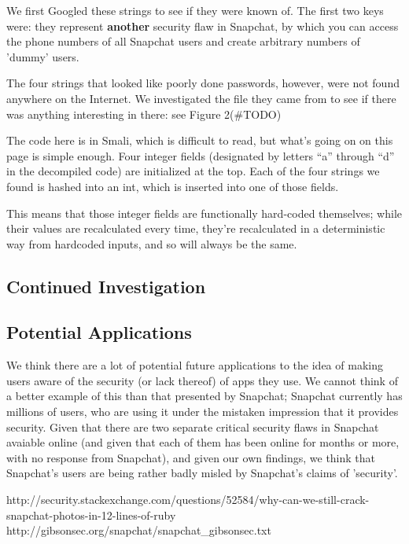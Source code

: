 \documentclass[11pt]{article}
\numberwithin{theorem}{subsection}
\begin{document}
We first Googled these strings to see if they were known of.  The first two keys were: they represent \textbf{another} security
flaw in Snapchat, by which you can access the phone numbers of all Snapchat users and create arbitrary numbers of 'dummy' users.\cite{2}

The four strings that looked like poorly done passwords, however, were not found anywhere on the Internet.  We investigated the file
they came from to see if there was anything interesting in there: see Figure 2(\#TODO)

The code here is in Smali, which is difficult to read, but what's going on on this page is simple enough.  Four integer fields (designated by
letters ``a'' through ``d'' in the decompiled code) are initialized at the top.  Each of the four strings we found is hashed into an int, which 
is inserted into one of those fields.

This means that those integer fields are functionally hard-coded themselves; while their values are recalculated every time, they're recalculated in a
deterministic way from hardcoded inputs, and so will always be the same.

\subsection{Continued Investigation}

\subsection{Potential Applications}

We think there are a lot of potential future applications to the idea of making users aware of the security (or lack thereof) of apps they use.  We
cannot think of a better example of this than that presented by Snapchat; Snapchat currently has millions of users, who are using it under the
mistaken impression that it provides security.  Given that there are two separate critical security flaws in Snapchat avaiable online (and given that
each of them has been online for months or more, with no response from Snapchat), and given our own findings, we think that Snapchat's users are being
rather badly misled by Snapchat's claims of 'security'.

\begin{thebibliography}{9}

        http://security.stackexchange.com/questions/52584/why-can-we-still-crack-snapchat-photos-in-12-lines-of-ruby
        http://gibsonsec.org/snapchat/snapchat_gibsonsec.txt

\end{thebibliography}
\end{document}
